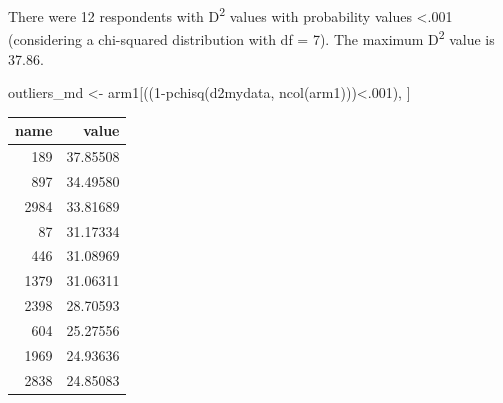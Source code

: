 \documentclass[
  letterpaper,
  DIV=11,
  numbers=noendperiod]{scrreprt}
\newenvironment{Shaded}{\begin{snugshade}}{\end{snugshade}}
\newcommand{\AttributeTok}[1]{\textcolor[rgb]{0.40,0.45,0.13}{#1}}
\newcommand{\DecValTok}[1]{\textcolor[rgb]{0.68,0.00,0.00}{#1}}
\newcommand{\FunctionTok}[1]{\textcolor[rgb]{0.28,0.35,0.67}{#1}}
\newcommand{\NormalTok}[1]{\textcolor[rgb]{0.00,0.23,0.31}{#1}}
\newcommand{\OtherTok}[1]{\textcolor[rgb]{0.00,0.23,0.31}{#1}}
\newcommand{\SpecialCharTok}[1]{\textcolor[rgb]{0.37,0.37,0.37}{#1}}
\begin{document}
There were 12 respondents with D\textsuperscript{2} values with
probability values \textless.001 (considering a chi-squared distribution
with df = 7). The maximum D\textsuperscript{2} value is 37.86.

\begin{Shaded}
\begin{Highlighting}[]
\NormalTok{outliers\_md }\OtherTok{\textless{}{-}}\NormalTok{ arm1[((}\DecValTok{1}\SpecialCharTok{{-}}\FunctionTok{pchisq}\NormalTok{(d2mydata, }\FunctionTok{ncol}\NormalTok{(arm1)))}\SpecialCharTok{\textless{}}\NormalTok{.}\DecValTok{001}\NormalTok{), ]}
\end{Highlighting}
\end{Shaded}

\begin{Shaded}
\end{Shaded}

\begin{tabular}[t]{r|r}
\hline
name & value\\
\hline
189 & 37.85508\\
\hline
897 & 34.49580\\
\hline
2984 & 33.81689\\
\hline
87 & 31.17334\\
\hline
446 & 31.08969\\
\hline
1379 & 31.06311\\
\hline
2398 & 28.70593\\
\hline
604 & 25.27556\\
\hline
1969 & 24.93636\\
\hline
2838 & 24.85083\\
\hline
\end{tabular}
\end{document}
